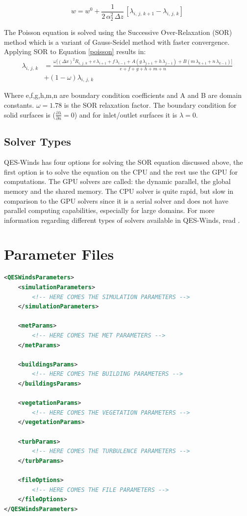 \begin{equation}
\label{eu-lag3}
 w = w^0 + \frac{1}{2\,\alpha_2^2\,\Delta z}\,[\lambda_{i,\,j,\,k+1}-\lambda_{i,\,j,\,k}]
\end{equation}

The Poisson equation is solved using the Successive Over-Relaxation (SOR) method which is a variant of Gauss-Seidel method with faster convergence. Applying SOR to Equation \ref{poisson} results in:
\begin{equation}
\label{SOR}
\begin{split}
 \lambda_{i,\,j,\,k} & = \frac{\omega\Bigg[(\Delta x)^2 R_{i,\,j,\,k}+e\,\lambda_{i+1}+f\, \lambda_{i-1}+A(g\,\lambda_{j+1}+h\, \lambda_{j-1}) + B(m\,\lambda_{k+1}+n\, \lambda_{k-1})\Bigg]}{e+f+g+h+m+n}\\
 & +(1-\omega)\lambda_{i,\,j,\,k}
 \end{split}
\end{equation}

Where e,f,g,h,m,n are boundary condition coefficients and A and B are domain constants. $\omega = 1.78$ is the SOR relaxation factor. The boundary condition for solid surfaces is ($\frac{\partial \lambda}{\partial n}=0$) and for inlet/outlet surfaces it is $\lambda=0$.


\subsection{Solver Types}

QES-Winds has four options for solving the SOR equation discussed above, the first option is to solve the equation on the CPU and the rest use the GPU for computations. The GPU solvers are called: the dynamic parallel, the global memory and the shared memory. The CPU solver is quite rapid, but slow in comparison to the GPU solvers since it is a serial solver and does not have parallel computing capabilities, especially for large domains. For more information regarding different types of solvers available in QES-Winds, read \cite{Bozorgmehr2021}.

\section{Parameter Files}

\begin{lstlisting}[language=XML]
<QESWindsParameters>
	<simulationParameters>
		<!-- HERE COMES THE SIMULATION PARAMETERS -->
	</simulationParameters>
		
	<metParams>
		<!-- HERE COMES THE MET PARAMETERS -->
	</metParams>
	
	<buildingsParams>
		<!-- HERE COMES THE BUILDING PARAMETERS -->
	</buildingsParams>

	<vegetationParams>
		<!-- HERE COMES THE VEGETATION PARAMETERS -->
	</vegetationParams>	
	
	<turbParams>
		<!-- HERE COMES THE TURBULENCE PARAMETERS -->
	</turbParams>							
	
	<fileOptions>
		<!-- HERE COMES THE FILE PARAMETERS -->
	</fileOptions>
</QESWindsParameters>
\end{lstlisting}


